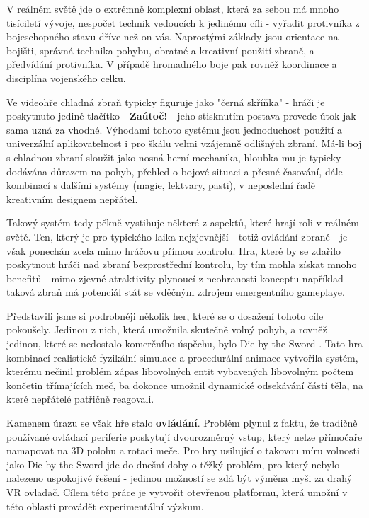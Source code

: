 V reálném světě jde o extrémně komplexní oblast, která za sebou má mnoho tisíciletí vývoje, nespočet technik vedoucích k jedinému cíli - vyřadit protivníka z bojeschopného stavu dříve než on vás. Naprostými základy jsou orientace na bojišti, správná technika pohybu, obratné a kreativní použití zbraně, a předvídání protivníka. V případě hromadného boje pak rovněž koordinace a disciplína vojenského celku. 

Ve videohře chladná zbraň typicky figuruje jako "černá skříňka" - hráči je poskytnuto jediné tlačítko - \textbf{Zaútoč!} - jeho stisknutím postava provede útok jak sama uzná za vhodné. Výhodami tohoto systému jsou jednoduchost použití a univerzální aplikovatelnost i pro škálu velmi vzájemně odlišných zbraní. Má-li boj s chladnou zbraní sloužit jako nosná herní mechanika, hloubka mu je typicky dodávána důrazem na pohyb, přehled o bojové situaci a přesné časování, dále kombinací s dalšími systémy (magie, lektvary, pasti), v neposlední řadě kreativním designem nepřátel.

Takový systém tedy pěkně vystihuje některé z aspektů, které hrají roli v reálném světě. Ten, který je pro typického laika nejzjevnější - totiž ovládání zbraně - je však ponechán zcela mimo hráčovu přímou kontrolu. Hra, které by se zdařilo poskytnout hráči nad zbraní bezprostřední kontrolu, by tím mohla získat mnoho benefitů - mimo zjevné atraktivity plynoucí z neohranosti konceptu například taková zbraň má potenciál stát se vděčným zdrojem emergentního gameplaye.

Představili jsme si podrobněji několik her, které se o dosažení tohoto cíle pokoušely. Jedinou z nich, která umožnila skutečně volný pohyb, a rovněž jedinou, které se nedostalo komerčního úspěchu, bylo Die by the Sword \cite{DieByTheSword}. Tato hra kombinací realistické fyzikální simulace a procedurální animace vytvořila systém, kterému nečinil problém zápas libovolných entit vybavených libovolným počtem končetin třímajících meč, ba dokonce umožnil dynamické odsekávání částí těla, na které nepřátelé patřičně reagovali. 

Kamenem úrazu se však hře stalo \textbf{ovládání}. Problém plynul z faktu, že tradičně používané ovládací periferie poskytují dvourozměrný vstup, který nelze přímočaře namapovat na 3D polohu a rotaci meče. Pro hry usilující o takovou míru volnosti jako Die by the Sword jde do dnešní doby o těžký problém, pro který nebylo nalezeno uspokojivé řešení - jedinou možností se zdá být výměna myši za drahý \acs{VR} ovladač. Cílem této práce je vytvořit otevřenou platformu, která umožní v této oblasti provádět experimentální výzkum.
